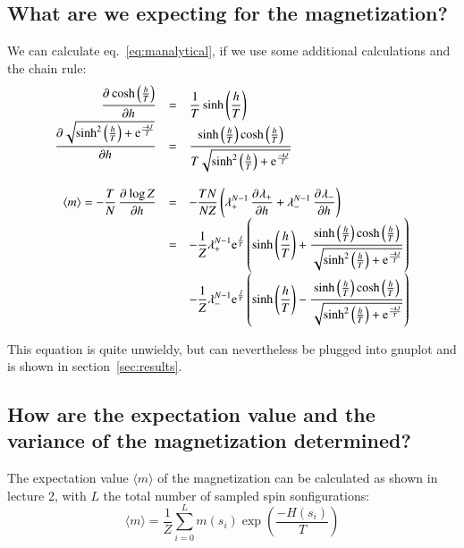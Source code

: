 \documentclass{scrartcl}
\begin{document}
\subsection{What are we expecting for the magnetization?}
\label{subsec:expectationmagnetization}
We can calculate eq.~\ref{eq:manalytical}, if we use some additional calculations and the chain rule:
\[\begin{array}{>{\displaystyle}r>{\displaystyle}c>{\displaystyle}l}
\dpd{\cosh\left( \frac{h}{T}\right)}{h}
&=&\frac{1}{T}\sinh\left( \frac{h}{T}\right)\\

\dpd{\sqrt{\sinh^2\left(\frac{h}{T} \right)+\text{e}^{\frac{-4J}{T}} }}{h}
&=&\frac{\sinh\left( \frac{h}{T}\right)\cosh\left( \frac{h}{T}\right)}
{T\sqrt{\sinh^2\left(\frac{h}{T} \right)+\text{e}^{\frac{-4J}{T}} }}\\

&&\\

\langle m\rangle =-\frac{T}{N}\dpd{\log Z}{h}
&=&-\frac{TN}{NZ}\left( \lambda_+^{N-1}\dpd{\lambda_+}{h}+\lambda_-^{N-1}\dpd{\lambda_-}{h}\right) \\

&=&-\frac{1}{Z} 
\lambda_+^{N-1} \text{e}^{\frac{J}{T}}
\left( \sinh\left(\frac{h}{T} \right) 
+ \frac{\sinh\left( \frac{h}{T}\right)\cosh\left( \frac{h}{T}\right)}
{\sqrt{\sinh^2\left(\frac{h}{T} \right)+\text{e}^{\frac{-4J}{T}} }} \right)\\

  
&&-\frac{1}{Z}\lambda_-^{N-1}\text{e}^{\frac{J}{T}}
\left( \sinh\left(\frac{h}{T} \right) 
- \frac{\sinh\left( \frac{h}{T}\right)\cosh\left( \frac{h}{T}\right)}
{\sqrt{\sinh^2\left(\frac{h}{T} \right)+\text{e}^{\frac{-4J}{T}} }} \right)

\end{array}\]

This equation is quite unwieldy, but can nevertheless be plugged into gnuplot and is shown in section~\ref{sec:results}.
	
\subsection{How are the expectation value and the variance of the magnetization determined?}

The expectation value $\langle m\rangle$ of the magnetization can be calculated as shown in lecture 2, with $L$ the total number of sampled spin sonfigurations: 
\[\langle m\rangle=\frac{1}{Z}\sum_{i=0}^{L}m(s_i)\exp\left( \frac{-H(s_i)}{T}\right) \]
\end{document}
